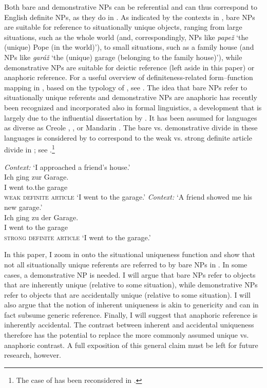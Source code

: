 \documentclass[output=paper,colorlinks,citecolor=brown,newtxmath]{langscibook}
\begin{document}
\noindent Both bare and demonstrative NPs can be referential and can thus correspond to English definite NPs, as they do in . As indicated by the contexts in , bare NPs are suitable for reference to situationally unique objects, ranging from large situations, such as the whole world (and, correspondingly, NPs like \textit{papež} `the (unique) Pope (in the world)'), to small situations, such as a family house (and NPs like \textit{garáž} `the (unique) garage (belonging to the family house)'), while demonstrative NPs are suitable for deictic reference (left aside in this paper) or anaphoric reference. For a useful overview of definiteness-related form--function mapping in , based on the typology of \citet{Hawkins1978}, see \citet[chapter 3]{Belicova.Uhlirova1996}. The idea that bare NPs refer to situationally unique referents and demonstrative NPs are anaphoric has recently been recognized and incorporated also in formal linguistics, a development that is largely due to the influential dissertation by \citet{Schwarz2009}. It has been assumed for languages as diverse as  Creole \citep{Wespel2008},  \citep{Arkoh.Matthewson2013}, or Mandarin  \citep{Jenks2018}. The bare vs. demonstrative divide in these languages is considered by \citet{Schwarz2013} to correspond to the weak vs. strong definite article divide in ; see .\footnote{The case of  has been reconsidered in \citet{Bombi2018}.}

\largerpage[-1] %

\ea \label{simik:ex:ger:weak-strong}\ea\textit{Context:} `I approached a friend's house.'\label{simik:ex:ger:weak-strong-a}\\
\gll Ich ging zur Garage.\\
I went to.the garage\\\hfill\textsc{weak definite article}
\glt `I went to the garage.'
\ex \textit{Context:} `A friend showed me his new garage.'\label{simik:ex:ger:weak-strong-b}\\
\gll Ich ging zu der Garage.\\
I went to the garage\\\hfill\textsc{strong definite article}
\glt `I went to the garage.'
\z\z

\noindent In this paper, I zoom in onto the situational uniqueness function and show that not all situationally unique referents are referred to by bare NPs in . In some cases, a demonstrative NP is needed. I will argue that bare NPs refer to objects that are inherently unique (relative to some situation), while demonstrative NPs refer to objects that are accidentally unique (relative to some situation). I will also argue that the notion of inherent uniqueness is akin to genericity and can in fact subsume generic reference. Finally, I will suggest that anaphoric reference is inherently accidental. The contrast between inherent and accidental uniqueness therefore has the potential to replace the more commonly assumed unique vs. anaphoric contrast. A full exposition of this general claim must be left for future research, however.
\end{document}
